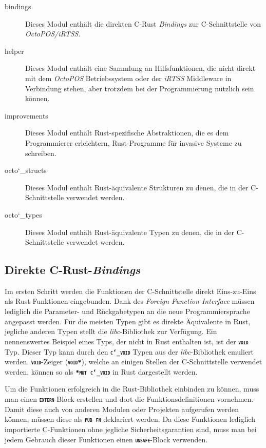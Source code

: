 \begin{description}

	\item[bindings] 
	Dieses Modul enthält die direkten C-Rust \textit{Bindings} zur C-Schnittstelle von \textit{OctoPOS/iRTSS}.
	
	\item[helper]
	Dieses Modul enthält eine Sammlung an Hilfsfunktionen, die nicht direkt mit dem \textit{OctoPOS} Betriebssystem 
	oder der \textit{iRTSS} Middleware in Verbindung stehen, aber trotzdem bei der Programmierung
	nützlich sein können.
	
	\item[improvements]
	Dieses Modul enthält Rust-spezifische Abstraktionen, die es dem Programmierer erleichtern,
	Rust-Programme für invasive Systeme zu schreiben.
	
	\item[octo\char`_structs]
	Dieses Modul enthält Rust-äquivalente Strukturen zu denen, die in der C-Schnittstelle verwendet werden.
	
	\item[octo\char`_types]
	Dieses Modul enthält Rust-äquivalente Typen zu denen, die in der C-Schnittstelle verwendet werden.

\end{description}

\subsection{Direkte C-Rust-\textit{Bindings}}

Im ersten Schritt werden die Funktionen der C-Schnittstelle direkt Eins-zu-Eins als Rust-Funktionen eingebunden.
Dank des \textit{Foreign Function Interface} müssen lediglich die Parameter- und Rückgabetypen
an die neue Programmiersprache angepasst werden.
Für die meisten Typen gibt es direkte Äquivalente in Rust, jegliche anderen Typen
stellt die \textit{libc}-Bibliothek zur Verfügung. Ein nennenswertes Beispiel eines Typs, der nicht in Rust enthalten 
ist, ist der \texttt{\textsc{\textbf{void}}} Typ. Dieser Typ kann durch den
\texttt{\textsc{\textbf{c\char`_void}}} Typen aus der \textit{libc}-Bibliothek emuliert werden.
\texttt{\textsc{\textbf{void}}}-Zeiger (\texttt{\textsc{\textbf{void*}}}), welche an einigen Stellen der
C-Schnittstelle verwendet werden, können so als \texttt{\textsc{\textbf{*mut c\char`_void}}} in Rust
dargestellt werden.

Um die Funktionen erfolgreich in die Rust-Bibliothek einbinden zu können,
muss man einen \texttt{\textsc{\textbf{extern}}}-Block erstellen und dort
die Funktionsdefinitionen vornehmen.
Damit diese auch von anderen Modulen oder Projekten aufgerufen werden können, müssen diese
als \texttt{\textsc{\textbf{pub fn}}} deklariert werden.
Da diese Funktionen lediglich importierte C-Funktionen ohne jegliche Sicherheitsgarantien
sind, muss man bei jedem Gebrauch dieser Funktionen einen \texttt{\textsc{\textbf{unsafe}}}-Block verwenden.

